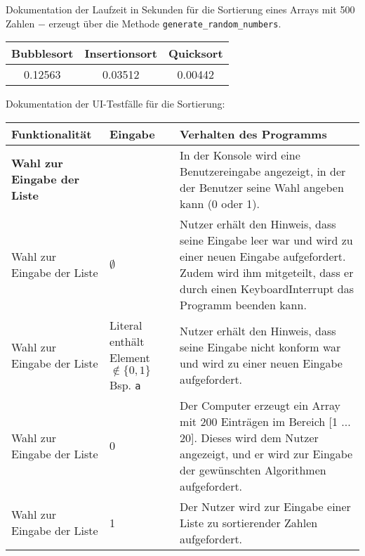 \documentclass[a4paper]{article}
\begin{document}
\begin{exercise}{1}

Dokumentation der Laufzeit in Sekunden f\"ur die Sortierung eines Arrays mit 500 Zahlen $-$ erzeugt \"uber
die Methode \texttt{generate\_random\_numbers}.

\begin{center}
	\begin{tabular}{| c | c | c |}
		\hline
		Bubblesort & Insertionsort & Quicksort\\ \hline \hline
		0.12563 & 0.03512 & 0.00442\\ \hline
	\end{tabular}
\end{center}


Dokumentation der UI-Testf\"alle f\"ur die Sortierung:

\begin{center}	
	\begin{tabular}{| p{2.5cm} | p{3.2cm} | p{9cm} |}
		\hline
		Funktionalit\"at & Eingabe & Verhalten des Programms\\ \hline \hline
		
		\textbf{Wahl zur Eingabe der Liste} & 
		& In der Konsole wird eine Benutzereingabe angezeigt, in der der Benutzer seine Wahl
		angeben kann (0 oder 1). \\ \hline
		
		Wahl zur Eingabe der Liste & $\emptyset$
		& Nutzer erh\"alt den Hinweis, dass seine Eingabe leer war und wird zu einer neuen Eingabe
		aufgefordert. Zudem wird ihm mitgeteilt, dass er durch einen KeyboardInterrupt das Programm
		beenden kann. \\ \hline
		
		Wahl zur Eingabe der Liste & Literal enth\"alt Element $\notin \{0, 1\}$ \newline Bsp. \texttt{a}
		& Nutzer erh\"alt den Hinweis, dass seine Eingabe nicht konform war und wird zu einer
		neuen Eingabe aufgefordert.\\ \hline
		
		Wahl zur Eingabe der Liste & 0
		& Der Computer erzeugt ein Array mit 200 Eintr\"agen im Bereich [1 ... 20]. Dieses wird dem
		Nutzer angezeigt, und er wird zur Eingabe der gew\"unschten Algorithmen aufgefordert.\\ \hline
		
		Wahl zur Eingabe der Liste & 1
		& Der Nutzer wird zur Eingabe einer Liste zu sortierender Zahlen aufgefordert.\\ \hline
		

\end{tabular}
\end{center}
\end{exercise}
\end{document}
